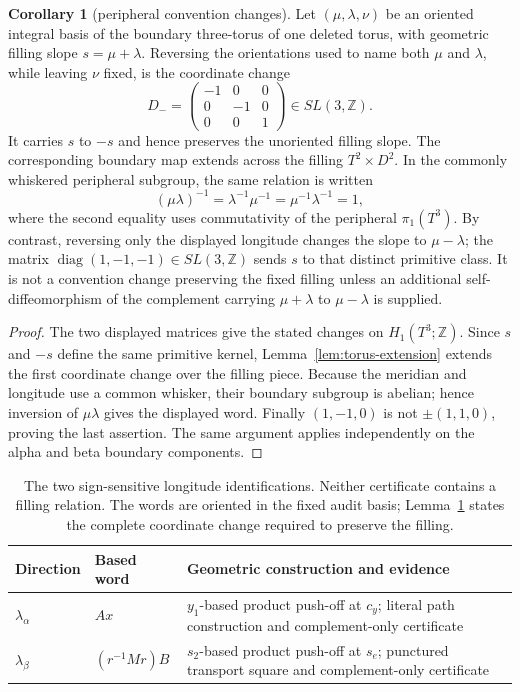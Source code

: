 \documentclass[11pt]{article}
\newcommand{\pione}{\pi_1}
\theoremstyle{definition}
\newtheorem{corollary}[theorem]{Corollary}
\begin{document}
\begin{corollary}[peripheral convention changes]\label{lem:sign-conventions}
Let $(\mu,\lambda,\nu)$ be an oriented integral basis of the boundary
three-torus of one deleted torus, with geometric filling slope
$s=\mu+\lambda$.  Reversing the orientations used to name both $\mu$ and
$\lambda$, while leaving $\nu$ fixed, is the coordinate change
\[
 D_- = \begin{pmatrix}-1&0&0\\0&-1&0\\0&0&1\end{pmatrix}
 \in SL(3,\mathbb Z).
\]
It carries $s$ to $-s$ and hence preserves the unoriented filling slope.
The corresponding boundary map extends across the filling
$T^2\times D^2$.  In the commonly whiskered peripheral subgroup, the same
relation is written
\[
 (\mu\lambda)^{-1}=\lambda^{-1}\mu^{-1}
   =\mu^{-1}\lambda^{-1}=1,
\]
where the second equality uses commutativity of the peripheral
$\pione(T^3)$.
By contrast, reversing only the displayed longitude changes the slope to
$\mu-\lambda$; the matrix
$\operatorname{diag}(1,-1,-1)\in SL(3,\mathbb Z)$ sends $s$ to that distinct
primitive class.  It is not a convention change preserving the fixed
filling unless an additional self-diffeomorphism of the complement carrying
$\mu+\lambda$ to $\mu-\lambda$ is supplied.
\end{corollary}

\begin{proof}
The two displayed matrices give the stated changes on
$H_1(T^3;\mathbb Z)$.  Since $s$ and $-s$ define the same primitive kernel,
Lemma~\ref{lem:torus-extension} extends the first coordinate change over the
filling piece.  Because the meridian and longitude use a common whisker,
their boundary subgroup is abelian; hence inversion of
$\mu\lambda$ gives the displayed word.  Finally $(1,-1,0)$ is not
$\pm(1,1,0)$, proving the last assertion.  The same argument applies
independently on the alpha and beta boundary components.
\end{proof}

\begin{table}[!htbp]
\centering
\small
\renewcommand{\arraystretch}{1.2}
\begin{tabularx}{\textwidth}{@{}>{\raggedright\arraybackslash}p{}
 >{\raggedright\arraybackslash}p{}X@{}}
\toprule
Direction & Based word & Geometric construction and evidence \\
\midrule
$\lambda_\alpha$ & $Ax$ & $y_1$-based product push-off at $c_y$;
literal path construction and complement-only certificate \\
$\lambda_\beta$ & $(r^{-1}Mr)B$ & $s_2$-based product push-off at $s_e$;
punctured transport square and complement-only certificate \\
\bottomrule
\end{tabularx}
\caption{The two sign-sensitive longitude identifications.  Neither
certificate contains a filling relation.  The words are oriented in the
fixed audit basis; Lemma~\ref{lem:sign-conventions} states the complete
coordinate change required to preserve the filling.}
\label{tab:longitudes}
\end{table}
\FloatBarrier
\end{document}
